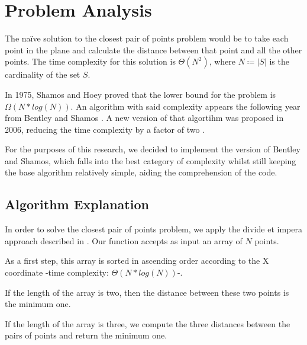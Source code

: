 \section{Problem Analysis}
\label{sec:problem_analysis}

The na\"ive solution to the closest pair of points problem would be to take each point
in the plane and calculate the distance between that point and all
the other points. The time complexity for this solution is $\Theta(N^2)$,
where $N\coloneqq|S|$ is the cardinality of the set $S$.


In 1975, Shamos and Hoey proved that the lower bound for the problem is $\Omega(N * log(N))$\cite[§2, theorem 1]{closest_pair_definition}. An algorithm with said complexity appears
the following year from Bentley and Shamos \cite{divide_and_conq_3NlgN}.
A new version of that algortihm was proposed in 2006, reducing the time complexity by a factor of two \cite{ge2006improved}.

For the purposes of this research, we decided to implement the version of Bentley and Shamos, which falls into the best category of complexity whilst still keeping the base algorithm relatively simple, aiding the comprehension of the code.

\subsection{Algorithm Explanation}

In order to solve the closest pair of points problem, we apply the divide et impera approach described in \cite{divide_and_conq_3NlgN}.
Our function accepts as input an array of $N$ points.

As a first step, this array is sorted in ascending order according to the X coordinate -time complexity: $\Theta(N*log(N))$-.

If the length of the array is two, then the distance between these two points is the minimum one.

If the length of the array is three, we compute the three distances between the pairs of points and return the minimum one.

